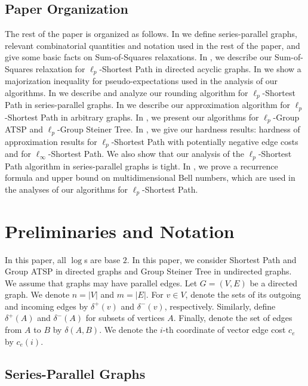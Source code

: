 \documentclass[11pt,a4paper]{article}
\begin{document}
\subsection{Paper Organization}
The rest of the paper is organized as follows.
In  we define series-parallel graphs, relevant combinatorial quantities and notation used in the rest of the paper, and give some basic facts on Sum-of-Squares relaxations.
In , we describe our Sum-of-Squares relaxation for \(\ell_p\)-Shortest Path in directed acyclic graphs.
In  we show a majorization inequality for pseudo-expectations used in the analysis of our algorithms.
In  we describe and analyze our rounding algorithm for \(\ell_p\)-Shortest Path in series-parallel graphs.
In  we describe our approximation algorithm for \(\ell_p\)-Shortest Path in arbitrary graphs.
In , we present our algorithms for \(\ell_p\)-Group ATSP and \(\ell_p\)-Group Steiner Tree.
In , we give our hardness results: hardness of approximation results for \(\ell_p\)-Shortest Path with potentially negative edge costs and for \(\ell_\infty\)-Shortest Path. We also show that our analysis of the \(\ell_p\)-Shortest Path algorithm in series-parallel graphs is tight.
In , we prove a recurrence formula and upper bound on multidimensional Bell numbers, which are used in the analyses of our algorithms for \(\ell_p\)-Shortest Path.

\section{Preliminaries and Notation} \label{sec:prelim}
In this paper, all \(\log\)s are base \(2\).
In this paper, we consider Shortest Path and Group ATSP in directed graphs and Group Steiner Tree in undirected graphs. We assume that graphs may have parallel edges. 
Let $G=(V, E)$ be a directed graph. We denote $n=|V|$ and $m=|E|$.
For \(v \in V\), denote the sets of its outgoing and incoming edges by \(\delta^+(v)\) and \(\delta^-(v)\), respectively. Similarly, define \(\delta^+(A)\) and \(\delta^-(A)\) for subsets of vertices $A$. Finally,  denote the set of edges from $A$ to $B$ by $\delta(A,B)$. We denote the $i$-th coordinate of vector edge cost $c_e$ by $c_e(i)$.
\subsection{Series-Parallel Graphs}
\end{document}
